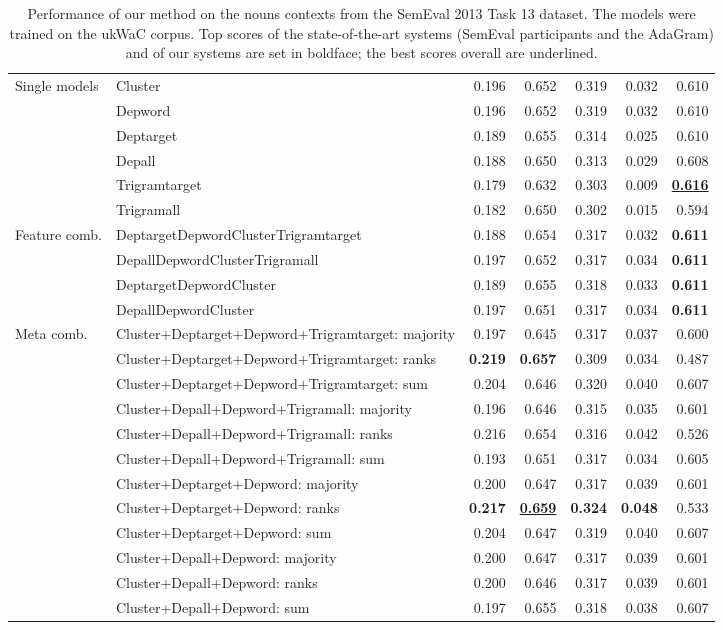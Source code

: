 \documentclass[11pt]{article}
\begin{document}
\begin{table}[t]
\begin{tabular}{llrrr|rr}
Single models & Cluster & 0.196 & 0.652 & 0.319 & 0.032 &  0.610 \\
 & Depword & 0.196 & 0.652 & 0.319 & 0.032 &  0.610 \\
 & Deptarget & 0.189 & 0.655 & 0.314 & 0.025 &  0.610 \\
 & Depall & 0.188 & 0.650 & 0.313 & 0.029 & 0.608 \\
 & Trigramtarget & 0.179 & 0.632 & 0.303 & 0.009 & \bf \underline{0.616} \\
 & Trigramall & 0.182 & 0.650 & 0.302 & 0.015 & 0.594 \\ 
\midrule
Feature comb. & DeptargetDepwordClusterTrigramtarget & 0.188 & 0.654 & 0.317 & 0.032 & \bf  0.611 \\
 & DepallDepwordClusterTrigramall & 0.197 & 0.652 & 0.317 & 0.034 & \bf 0.611 \\
 & DeptargetDepwordCluster & 0.189 & 0.655 & 0.318 & 0.033 & \bf  0.611 \\
 & DepallDepwordCluster & 0.197 & 0.651 & 0.317 & 0.034 & \bf 0.611 \\

\midrule

Meta comb. & Cluster+Deptarget+Depword+Trigramtarget: majority & 0.197 & 0.645 & 0.317 & 0.037 & 0.600 \\
 & Cluster+Deptarget+Depword+Trigramtarget: ranks & {\bf 0.219} & \bf 0.657 & 0.309 & 0.034 & 0.487 \\
 & Cluster+Deptarget+Depword+Trigramtarget: sum & 0.204 & 0.646 & 0.320 & 0.040 & 0.607 \\
 & Cluster+Depall+Depword+Trigramall: majority & 0.196 & 0.646 & 0.315 & 0.035 & 0.601 \\
 & Cluster+Depall+Depword+Trigramall: ranks & 0.216 & 0.654 & 0.316 & 0.042 & 0.526 \\
 & Cluster+Depall+Depword+Trigramall: sum & 0.193 & 0.651 & 0.317 & 0.034 & 0.605 \\
 & Cluster+Deptarget+Depword: majority & 0.200 & 0.647 & 0.317 & 0.039 & 0.601 \\
 & Cluster+Deptarget+Depword: ranks & \bf 0.217 &  \underline{\bf 0.659} & {\bf 0.324} & {\bf 0.048} & 0.533 \\
 & Cluster+Deptarget+Depword: sum & 0.204 & 0.647 & 0.319 & 0.040 & 0.607 \\
 & Cluster+Depall+Depword: majority & 0.200 & 0.647 & 0.317 & 0.039 & 0.601 \\
 & Cluster+Depall+Depword: ranks & 0.200 & 0.646 & 0.317 & 0.039 & 0.601 \\
 & Cluster+Depall+Depword: sum & 0.197 & 0.655 & 0.318 & 0.038 & 0.607 \\

\bottomrule

        
\end{tabular}
\caption{Performance of our method on the nouns contexts from the SemEval 2013 Task 13 dataset. The models were trained on the ukWaC corpus.
 Top scores of the state-of-the-art systems (SemEval participants and the AdaGram) and of our systems are set in boldface; the best scores overall are underlined. }
\label{tab:results-semeval}
\end{table}
\end{document}
